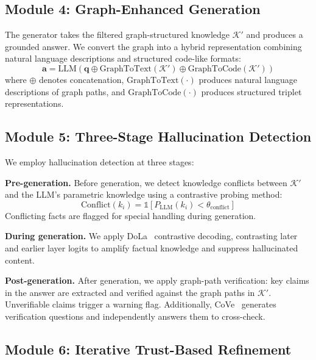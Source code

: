 \documentclass[11pt,a4paper]{article}
\begin{document}
\subsection{Module 4: Graph-Enhanced Generation}

The generator takes the filtered graph-structured knowledge $\mathcal{K}'$ and produces a grounded answer. We convert the graph into a hybrid representation combining natural language descriptions and structured code-like formats:
\begin{equation}
    \mathbf{a} = \text{LLM}(\mathbf{q} \oplus \text{GraphToText}(\mathcal{K}') \oplus \text{GraphToCode}(\mathcal{K}'))
\end{equation}
where $\oplus$ denotes concatenation, $\text{GraphToText}(\cdot)$ produces natural language descriptions of graph paths, and $\text{GraphToCode}(\cdot)$ produces structured triplet representations.

\subsection{Module 5: Three-Stage Hallucination Detection}

We employ hallucination detection at three stages:

\textbf{Pre-generation.} Before generation, we detect knowledge conflicts between $\mathcal{K}'$ and the LLM's parametric knowledge using a contrastive probing method:
\begin{equation}
    \text{Conflict}(k_i) = \mathbb{1}[P_{\text{LLM}}(k_i) < \theta_{\text{conflict}}]
\end{equation}
Conflicting facts are flagged for special handling during generation.

\textbf{During generation.} We apply DoLa~\cite{chuang2023dola} contrastive decoding, contrasting later and earlier layer logits to amplify factual knowledge and suppress hallucinated content.

\textbf{Post-generation.} After generation, we apply graph-path verification: key claims in the answer are extracted and verified against the graph paths in $\mathcal{K}'$. Unverifiable claims trigger a warning flag. Additionally, CoVe~\cite{dhuliawala2023chain} generates verification questions and independently answers them to cross-check.

\subsection{Module 6: Iterative Trust-Based Refinement}
\end{document}

